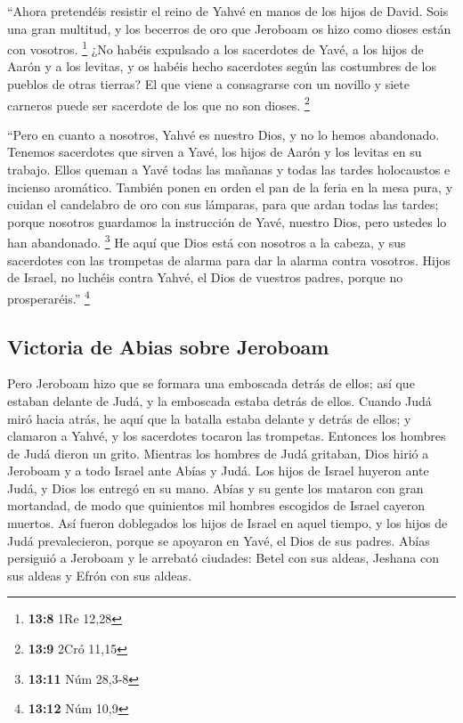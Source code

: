 \begin{paracol}{2}
 ``Ahora pretendéis resistir el reino de Yahvé en manos de
los hijos de David. Sois una gran multitud, y los becerros de oro que
Jeroboam os hizo como dioses están con vosotros. \footnote{\textbf{13:8}
  1Re 12,28}  ¿No habéis expulsado a los sacerdotes de
Yavé, a los hijos de Aarón y a los levitas, y os habéis hecho sacerdotes
según las costumbres de los pueblos de otras tierras? El que viene a
consagrarse con un novillo y siete carneros puede ser sacerdote de los
que no son dioses. \footnote{\textbf{13:9} 2Cró 11,15}

 ``Pero en cuanto a nosotros, Yahvé es nuestro Dios, y no
lo hemos abandonado. Tenemos sacerdotes que sirven a Yavé, los hijos de
Aarón y los levitas en su trabajo.  Ellos queman a Yavé
todas las mañanas y todas las tardes holocaustos e incienso aromático.
También ponen en orden el pan de la feria en la mesa pura, y cuidan el
candelabro de oro con sus lámparas, para que ardan todas las tardes;
porque nosotros guardamos la instrucción de Yavé, nuestro Dios, pero
ustedes lo han abandonado. \footnote{\textbf{13:11} Núm 28,3-8}
 He aquí que Dios está con nosotros a la cabeza, y sus
sacerdotes con las trompetas de alarma para dar la alarma contra
vosotros. Hijos de Israel, no luchéis contra Yahvé, el Dios de vuestros
padres, porque no prosperaréis.'' \footnote{\textbf{13:12} Núm 10,9}

\hypertarget{victoria-de-abias-sobre-jeroboam}{%
\subsection{Victoria de Abias sobre
Jeroboam}\label{victoria-de-abias-sobre-jeroboam}}

 Pero Jeroboam hizo que se formara una emboscada detrás
de ellos; así que estaban delante de Judá, y la emboscada estaba detrás
de ellos.  Cuando Judá miró hacia atrás, he aquí que la
batalla estaba delante y detrás de ellos; y clamaron a Yahvé, y los
sacerdotes tocaron las trompetas.  Entonces los hombres
de Judá dieron un grito. Mientras los hombres de Judá gritaban, Dios
hirió a Jeroboam y a todo Israel ante Abías y Judá.  Los
hijos de Israel huyeron ante Judá, y Dios los entregó en su mano.
 Abías y su gente los mataron con gran mortandad, de modo
que quinientos mil hombres escogidos de Israel cayeron muertos.
 Así fueron doblegados los hijos de Israel en aquel
tiempo, y los hijos de Judá prevalecieron, porque se apoyaron en Yavé,
el Dios de sus padres.  Abías persiguió a Jeroboam y le
arrebató ciudades: Betel con sus aldeas, Jeshana con sus aldeas y Efrón
con sus aldeas.


\end{paracol}
